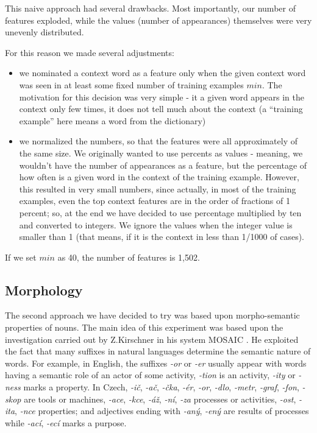 \documentclass[letterpaper]{article}
\begin{document}
This naive approach had several drawbacks. Most importantly, our number of features exploded, while the values (number of appearances) themselves were very unevenly distributed.

For this reason we made several adjustments:
\begin{itemize}
    \item we nominated a context word as a feature only when the given context word was seen in at least some fixed number of training examples $min$. The motivation for this decision was very simple - it a given word appears in the context only few times, it does not tell much about the context (a ``training example'' here means a word from the dictionary)
    
    \item we normalized the numbers, so that the features were all approximately of 
the same size. We originally wanted to use percents as values - meaning, 
we wouldn't have the number of appearances as a feature, but the percentage of how often is a given word in the context of the training example.    
     However, this resulted in very small numbers, since actually, 
in most of the training examples, even the top context features are in the order of 
fractions of 1 percent; so, at the end we have decided to use percentage multiplied by ten and converted to integers. 
We ignore the values when the integer value is smaller than 1 (that means, if it is the context in less than 1/1000 of cases).
     

\end{itemize}

If we set $min$ as 40, the number of features is 1,502.

\subsection{Morphology}
The second approach we have decided to try was based upon morpho-semantic properties of nouns.
The main idea of this experiment was based upon the investigation carried out by Z.Kirschner in his system MOSAIC \cite{kirschner1983}. He exploited the fact that many suffixes in natural languages determine the semantic nature of words. For example, in English, the suffixes {\it -or} or {\it -er} usually appear with words having a semantic role of an actor of some activity, {\it -tion} is an activity, {\it -ity} or {\it -ness} marks a property. In Czech,  {\it -i\v{c}}, {\it -a\v{c}}, {\it -\v{c}ka}, {\it -\'{e}r}, {\it -or}, {\it -dlo}, {\it -metr}, {\it -graf}, {\it -fon}, {\it -skop} are tools or machines, {\it -ace}, {\it -kce}, {\it -\'{a}\v{z}}, {\it -n\'{i}}, {\it -za} processes or activities,
{\it -ost}, {\it -ita}, {\it -nce} properties; and adjectives ending with {\it -an\'{y}}, {\it -en\'{y}} are results of processes while {\it -ac\'{i}}, {\it -ec\'{i}} marks a purpose.
\end{document}
